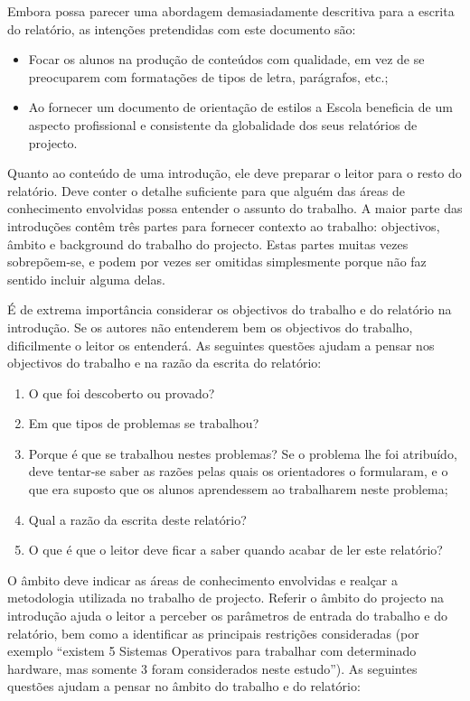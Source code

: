 Embora possa parecer uma abordagem demasiadamente descritiva para a escrita do relatório, as intenções pretendidas com este documento são:

\begin{itemize}
 \item Focar os alunos na produção de conteúdos com qualidade, em vez de se preocuparem com formatações de tipos de letra, parágrafos, etc.;
 \item Ao fornecer um documento de orientação de estilos a Escola beneficia de um aspecto profissional e consistente da globalidade dos seus relatórios de projecto.
\end{itemize}


Quanto ao conteúdo de uma introdução, ele deve preparar o leitor para o resto do relatório. Deve conter o detalhe suficiente para que alguém das áreas de conhecimento envolvidas possa entender o assunto do trabalho. A maior parte das introduções contêm três partes para fornecer contexto ao trabalho: objectivos, âmbito e background do trabalho do projecto. Estas partes muitas vezes sobrepõem-se, e podem por vezes ser omitidas simplesmente porque não faz sentido incluir alguma delas.

É de extrema importância considerar os objectivos do trabalho e do relatório na introdução. Se os autores não entenderem bem os objectivos do trabalho, dificilmente o leitor os entenderá. As seguintes questões ajudam a pensar nos objectivos do trabalho e na razão da escrita do relatório:

\begin{enumerate}
 \item O que foi descoberto ou provado?
 \item Em que tipos de problemas se trabalhou?
 \item Porque é que se trabalhou nestes problemas? Se o problema lhe foi atribuído, deve tentar-se saber as razões pelas quais os orientadores o formularam, e o que era suposto que os alunos aprendessem ao trabalharem neste problema;
 \item Qual a razão da escrita deste relatório?
 \item O que é que o leitor deve ficar a saber quando acabar de ler este relatório?
\end{enumerate}


O âmbito deve indicar as áreas de conhecimento envolvidas e realçar a metodologia utilizada no trabalho de projecto. Referir o âmbito do projecto na introdução ajuda o leitor a perceber os parâmetros de entrada do trabalho e do relatório, bem como a identificar as principais restrições consideradas (por exemplo “existem 5 Sistemas Operativos para trabalhar com determinado hardware, mas somente 3 foram considerados neste estudo”). As seguintes questões ajudam a pensar no âmbito do trabalho e do relatório:

